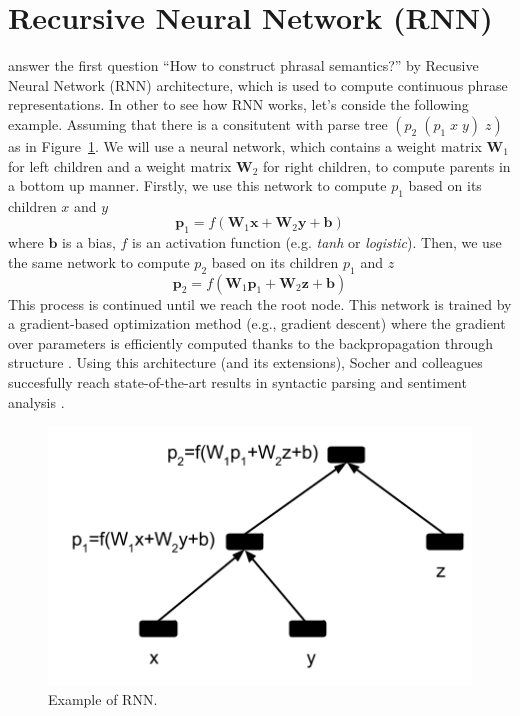 \documentclass[11pt]{article}
\begin{document}
\section{Recursive Neural Network (RNN)}
\label{section rnn}
\cite{socher_learning_2010} answer the first question ``How to construct phrasal semantics?'' 
by Recusive Neural Network (RNN) architecture, 
which is used to compute continuous phrase representations. In other to see how RNN works, 
let's conside the following example. Assuming that there is a consitutent with parse
tree $(p_2 \; (p_1 \; x \; y) \; z)$ as in Figure~\ref{figure rnn}. We will use a neural network, 
which contains a weight matrix $\mathbf{W}_1$ for left children and a weight matrix $\mathbf{W}_2$ 
for right children, to compute parents in a bottom up manner. Firstly, we use this network 
to compute $p_1$ based on its children $x$ and $y$
\begin{equation}
	\mathbf{p}_1 = f(\mathbf{W}_1 \mathbf{x} + \mathbf{W}_2 \mathbf{y} + \mathbf{b})
\end{equation}
where $\mathbf{b}$ is a bias, $f$ is an activation function (e.g. \textit{tanh} or \textit{logistic}).
Then, we use the same network to compute $p_2$ based on its children $p_1$ and $z$
\begin{equation}
	\mathbf{p}_2 = f(\mathbf{W}_1 \mathbf{p}_1 + \mathbf{W}_2 \mathbf{z} + \mathbf{b})
\end{equation}
This process is continued until we reach the root node.  This network is trained by 
a gradient-based optimization method (e.g., gradient descent) where the gradient 
over parameters is efficiently computed thanks to the backpropagation through structure
\cite{goller_learning_1996}. Using this architecture 
(and its extensions), Socher and colleagues succesfully reach 
state-of-the-art results in syntactic parsing \cite{socher2013parsing} and 
sentiment analysis \cite{socher2013recursive}. 
\begin{figure}
	\center
	\includegraphics[scale=0.5]{RNN.png}
	\caption{Example of RNN.}
	\label{figure rnn}
\end{figure}
\end{document}
